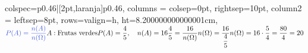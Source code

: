 \documentclass[12pt,twoside]{article}
\begin{document}
\begin{tblr}{
colspec={p{0.46\textwidth}|[2pt,laranja]p{0.46\textwidth}},
columns = {colsep=0pt, rightsep=10pt},
column{2} = {leftsep=8pt},
rows={valign=h, ht=8.200000000000001cm},
}
{$\definecolor{azulEscuro}{rgb}{0.25, 0.35, 0.89}\definecolor{rosaClaro}{rgb}{1, 0.52, 0.60}\textcolor{azulEscuro}{P(A)=\dfrac{n(A)}{n(\Omega)}} \vspace{5px} \\A: \text{Frutas verdes} \vspace{5px} \\P(A)=\dfrac{4}{5},\quad n(A)=16 \vspace{5px} \\\dfrac{4}{5}=\dfrac{16}{n(\Omega)} \vspace{5px} \\n(\Omega)=\dfrac{16}{\dfrac{4}{5}} \vspace{5px} \\n(\Omega)=16\cdot \dfrac{5}{4}=\dfrac{80}{4}=20$} \\ 
\end{tblr}
\end{document}
